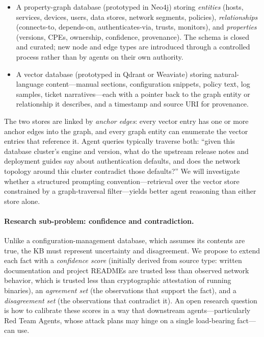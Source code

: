 \begin{itemize}[leftmargin=1.3em,itemsep=0.1em,topsep=0.2em]
  \item A property-graph database (prototyped in Neo4j) storing
  \emph{entities} (hosts, services, devices, users, data stores,
  network segments, policies), \emph{relationships} (connects-to,
  depends-on, authenticates-via, trusts, monitors), and
  \emph{properties} (versions, CPEs, ownership, confidence, provenance).
  The schema is closed and curated; new node and edge types are
  introduced through a controlled process rather than by agents on
  their own authority.
  \item A vector database (prototyped in Qdrant or Weaviate) storing
  natural-language content---manual sections, configuration snippets,
  policy text, log samples, ticket narratives---each with a pointer
  back to the graph entity or relationship it describes, and a
  timestamp and source URI for provenance.
\end{itemize}

The two stores are linked by \emph{anchor edges}: every vector entry
has one or more anchor edges into the graph, and every graph entity
can enumerate the vector entries that reference it. Agent queries
typically traverse both: ``given this database cluster's engine and
version, what do the upstream release notes and deployment guides say
about authentication defaults, and does the network topology around
this cluster contradict those defaults?'' We will investigate whether a
structured prompting convention---retrieval over the vector store
constrained by a graph-traversal filter---yields better agent reasoning
than either store alone.

\paragraph{Research sub-problem: confidence and contradiction.}
Unlike a configuration-management database, which assumes its contents
are true, the \sysname KB must represent uncertainty and disagreement.
We propose to extend each fact with a \emph{confidence score}
(initially derived from source type: written documentation and project
READMEs are trusted less than observed network behavior, which is
trusted less than cryptographic attestation of running binaries), an
\emph{agreement set} (the observations that support the fact), and a
\emph{disagreement set} (the observations that contradict it). An open
research question is how to calibrate these scores in a way that
downstream agents---particularly Red Team Agents, whose attack plans
may hinge on a single load-bearing fact---can use.

